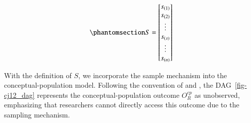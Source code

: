 \documentclass[
  authoryear,
  review,
  1p]{elsarticle}
\begin{document}
\begin{equation}\phantomsection\label{eq-mat25}{
S = \begin{bmatrix}
s_{(1)} \\
s_{(2)} \\
\vdots \\
s_{(s)} \\
\vdots \\
s_{(n)} \\
\end{bmatrix}
}\end{equation}

With the definition of \(S\), we incorporate the sample mechanism into
the conceptual-population model. Following the convention of
\citet[pp.~499-516]{McElreath_2020} and
\citet[pp.~6]{Deffner_et_al_2022}, the DAG~\ref{fig-cj12_dag} represents
the conceptual-population outcome \(O^{cp}_{R}\) as unobserved,
emphasizing that researchers cannot directly access this outcome due to
the sampling mechanism.
\end{document}
